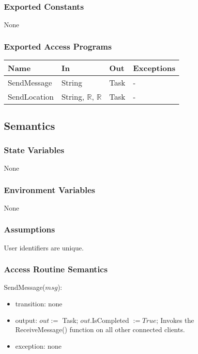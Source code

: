 \documentclass[12pt, titlepage]{article}
\begin{document}
\subsubsection{Exported Constants}

None

\subsubsection{Exported Access Programs}

\begin{center}
\begin{tabular}{p{4cm} p{3cm} p{2cm} p{3cm}}
\hline
\textbf{Name} & \textbf{In} & \textbf{Out} & \textbf{Exceptions} \\
\hline
SendMessage & String & Task & - \\
SendLocation & String, $\mathbb{R}$, $\mathbb{R}$ & Task & - \\

\hline
\end{tabular}
\end{center}

\subsection{Semantics}

\subsubsection{State Variables}

None

\subsubsection{Environment Variables}

None

\subsubsection{Assumptions}

User identifiers are unique.

\subsubsection{Access Routine Semantics}

\noindent SendMessage($msg$):
\begin{itemize}
\item transition: none
\item output: $out :=$ Task; $out$.IsCompleted $:= True$; Invokes the ReceiveMessage() function on all other connected clients. 
\item exception: none
\end{itemize}
\end{document}
